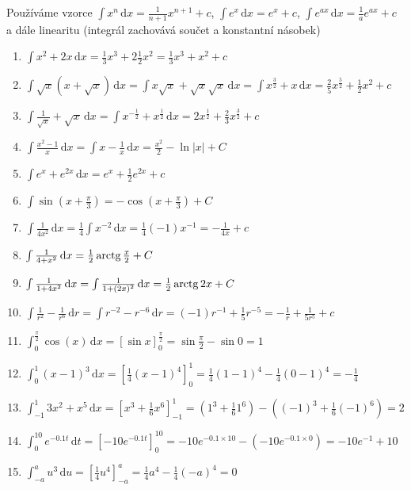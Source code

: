 Používáme vzorce $\int x^n\,\mathrm dx=\frac 1{n+1}x^{n+1}+c$, $\int e^x\,\mathrm dx=e^x+c$, $\int e^{ax}\,\mathrm dx=\frac 1a e^{ax}+c$ a dále linearitu (integrál zachovává součet a konstantní násobek)
\begin{enumerate}[(1)]
  \def\dx{\,\mathrm dx}
\item   $\int x^2+2x\dx=\frac 13 x^3 + 2\frac 12 x^2 = \frac 13 x^3+x^2+c$
\item  $\int \sqrt x(x+\sqrt x)\dx=\int x\sqrt x+\sqrt x\sqrt x\dx=\int x^{\frac 32}+x\dx=\frac 25 x^{\frac 52}+\frac 12 x^2+c$
\item  $\int \frac 1{\sqrt x}+\sqrt x \,\mathrm dx=\int x^{-\frac 12}+x^{\frac 12}\,\mathrm dx=2x^\frac 12+\frac 23 x^{\frac 32}+c$
\item $\int \frac{x^2-1}{x}\,\mathrm dx=\int x-\frac 1x \,\mathrm dx=\frac {x^2}{2} - \ln|x|+C$
\item $\int e^x+e^{2x}\,\mathrm dx=e^x+\frac 12 e^{2x}+c$
\item $\int \sin\left(x+\frac\pi 3\right)=-\cos\left(x+\frac \pi3\right)+C$
\item $\int\frac{1}{4x^2}\,\mathrm dx=\frac 14 \int x^{-2}\,\mathrm dx=\frac 14  (-1)x^{-1}=-\frac {1}{4x}+c$
\item $\int \frac{1}{4+x^2}\,\mathrm dx=\frac 12 \mathop{\mathrm{arctg}} \frac x2 +C$
\item $\int \frac{1}{1+4x^2}\,\mathrm dx=\int \frac{1}{1+(2x)^2}\,\mathrm dx=\frac 12 \mathop{\mathrm{arctg}} 2x +C$
\item $\int \frac 1{r^2}-\frac 1{r^6}\,\mathrm dr=\int r^{-2}-r^{-6}\,\mathrm dr=(-1)r^{-1}+\frac 15 r^{-5}=-\frac 1r+\frac 1{5r^5}+c$
\item $\int_0^{\frac \pi2}\cos(x)\,\mathrm dx=[\sin x]_0^{\frac \pi2}=\sin\frac \pi2- \sin 0=1$
\item $\int_0^1 (x-1)^3\,\mathrm dx=\left[\frac 14 (x-1)^4\right]_0^1=\frac 14 (1-1)^4- \frac 14 (0-1)^4=-\frac 14$
\item $\int_{-1}^1 3x^2+x^5\,\mathrm dx=\left[x^3+\frac 16 x^6\right]_{-1}^1=\left(1^3+\frac 16 1^6\right)-\left((-1)^3+\frac 16 (-1)^6\right)=2$
\item $\int_0^{10} e^{-0.1 t}\,\mathrm dt=\left[-10 e^{-0.1t}\right]_0^{10}=-10 e^{-0.1\times 10}-\left(-10 e^{-0.1\times 0}\right)=-10 e^{-1}+10$
\item  $\int_{-a}^{a} u^3\,\mathrm du=\left[\frac 14 u^4\right]_{-a}^a=\frac 14 a^4 - \frac 14 (-a)^4 = 0$
\end{enumerate}

